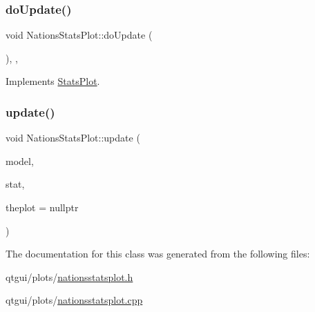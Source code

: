 \subsubsection{\texorpdfstring{doUpdate()}{doUpdate()}}
{\footnotesize\ttfamily void Nations\+Stats\+Plot\+::do\+Update (\begin{DoxyParamCaption}{ }\end{DoxyParamCaption})\hspace{0.3cm}{\ttfamily [override]}, {\ttfamily [protected]}, {\ttfamily [virtual]}}



Implements \mbox{\hyperlink{class_stats_plot_a363a428cc00b389a55a03e6d5d7c526e}{Stats\+Plot}}.

\mbox{\label{class_nations_stats_plot_ab4ac247ed98a4ea9e61b9d465ae586dd}} 
\subsubsection{\texorpdfstring{update()}{update()}}
{\footnotesize\ttfamily void Nations\+Stats\+Plot\+::update (\begin{DoxyParamCaption}\item[{\mbox{\hyperlink{class_displace_model}{Displace\+Model}} $\ast$}]{model,  }\item[{\mbox{\hyperlink{namespacedisplace_1_1plot_ab7b96ae3ae291a71823f371d77f27d98}{displace\+::plot\+::\+Nations\+Stat}}}]{stat,  }\item[{\mbox{\hyperlink{class_q_custom_plot}{Q\+Custom\+Plot}} $\ast$}]{theplot = {\ttfamily nullptr} }\end{DoxyParamCaption})}



The documentation for this class was generated from the following files\+:\begin{DoxyCompactItemize}
\item 
qtgui/plots/\mbox{\hyperlink{nationsstatsplot_8h}{nationsstatsplot.\+h}}\item 
qtgui/plots/\mbox{\hyperlink{nationsstatsplot_8cpp}{nationsstatsplot.\+cpp}}\end{DoxyCompactItemize}
